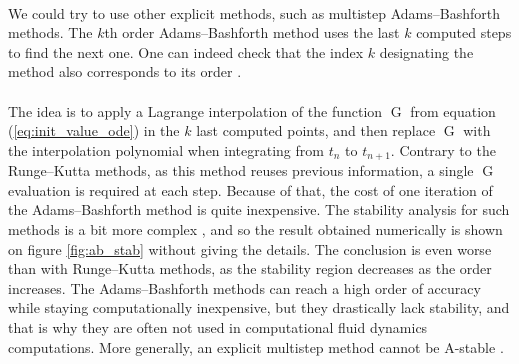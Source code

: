         \paragraph{}
        We could try to use other explicit methods, such as multistep Adams--Bashforth methods.
        The $k$th order Adams--Bashforth method uses the last $k$ computed steps to find the next one.
        One can indeed check that the index $k$ designating the method also corresponds to its order \cite{HairerNorsettWanner1993}.

        \paragraph{}
        The idea is to apply a Lagrange interpolation of the function $\operatorname{G}$ from equation (\ref{eq:init_value_ode}) in the $k$ last computed points, and then replace $\operatorname{G}$ with the interpolation polynomial when integrating from $t_n$ to $t_{n+1}$.
        Contrary to the Runge--Kutta methods, as this method reuses previous information, a single $\operatorname{G}$ evaluation is required at each step.
        Because of that, the cost of one iteration of the Adams--Bashforth method is quite inexpensive.
        The stability analysis for such methods is a bit more complex \cite{HairerNorsettWanner1993, HairerWanner1996}, and so the result obtained numerically is shown on figure \ref{fig:ab_stab} without giving the details.
        The conclusion is even worse than with Runge--Kutta methods, as the stability region decreases as the order increases.
        The Adams--Bashforth methods can reach a high order of accuracy while staying computationally inexpensive, but they drastically lack stability, and that is why they are often not used in computational fluid dynamics computations.
        More generally, an explicit multistep method cannot be A-stable \cite{Dahlquist1963}.

